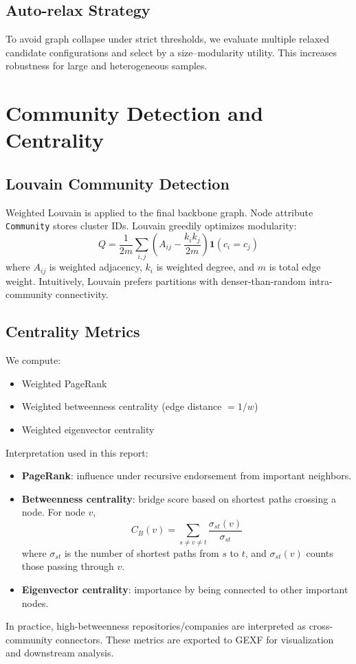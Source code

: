 \documentclass[11pt]{article}
\begin{document}
\subsection{Auto-relax Strategy}
To avoid graph collapse under strict thresholds, we evaluate multiple relaxed candidate configurations and select by a size--modularity utility.
This increases robustness for large and heterogeneous samples.

\section{Community Detection and Centrality}
\subsection{Louvain Community Detection}
Weighted Louvain is applied to the final backbone graph.
Node attribute \texttt{Community} stores cluster IDs.
Louvain greedily optimizes modularity:
\begin{equation}
Q=\frac{1}{2m}\sum_{i,j}\left(A_{ij}-\frac{k_i k_j}{2m}\right)\mathbf{1}(c_i=c_j)
\end{equation}
where $A_{ij}$ is weighted adjacency, $k_i$ is weighted degree, and $m$ is total edge weight.
Intuitively, Louvain prefers partitions with denser-than-random intra-community connectivity.

\subsection{Centrality Metrics}
We compute:
\begin{itemize}[leftmargin=1.5em]
    \item Weighted PageRank
    \item Weighted betweenness centrality (edge distance $=1/w$)
    \item Weighted eigenvector centrality
\end{itemize}
Interpretation used in this report:
\begin{itemize}[leftmargin=1.5em]
    \item \textbf{PageRank}: influence under recursive endorsement from important neighbors.
    \item \textbf{Betweenness centrality}: bridge score based on shortest paths crossing a node. For node $v$,
    \begin{equation}
    C_B(v)=\sum_{s\neq v\neq t}\frac{\sigma_{st}(v)}{\sigma_{st}}
    \end{equation}
    where $\sigma_{st}$ is the number of shortest paths from $s$ to $t$, and $\sigma_{st}(v)$ counts those passing through $v$.
    \item \textbf{Eigenvector centrality}: importance by being connected to other important nodes.
\end{itemize}
In practice, high-betweenness repositories/companies are interpreted as cross-community connectors.
These metrics are exported to GEXF for visualization and downstream analysis.
\end{document}
